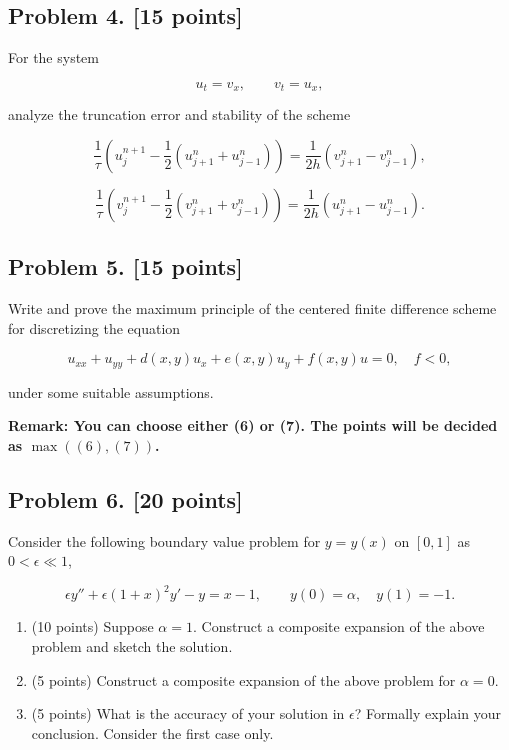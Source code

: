 \documentclass[11pt,a4paper]{article}
\begin{document}
\subsection{Problem 4. [15 points]}
For the system

\[
u_{t} = v_{x}, \qquad v_{t} = u_{x},
\]

analyze the truncation error and stability of the scheme

\[
\frac{1}{\tau} \left( u_{j}^{n+1} - \frac12 (u_{j+1}^{n} + u_{j-1}^{n}) \right) = \frac{1}{2h} (v_{j+1}^{n} - v_{j-1}^{n}),
\]

\[
\frac{1}{\tau} \left( v_{j}^{n+1} - \frac12 (v_{j+1}^{n} + v_{j-1}^{n}) \right) = \frac{1}{2h} (u_{j+1}^{n} - u_{j-1}^{n}).
\]

\subsection{Problem 5. [15 points]}
Write and prove the maximum principle of the centered finite difference scheme for discretizing the equation

\[
u_{xx} + u_{yy} + d(x,y) u_{x} + e(x,y) u_{y} + f(x,y) u = 0, \quad f < 0,
\]

under some suitable assumptions.

\noindent\textbf{Remark: You can choose either (6) or (7). The points will be decided as \(\max((6), (7))\).}

\subsection{Problem 6. [20 points]}
Consider the following boundary value problem for \(y = y(x)\) on \([0, 1]\) as \(0 < \epsilon \ll 1\),

\[
\epsilon y'' + \epsilon(1+x)^{2} y' - y = x - 1, \qquad y(0) = \alpha, \quad y(1) = -1.
\]

\begin{enumerate}[label=(\roman*)]
    \item (10 points) Suppose \(\alpha = 1\). Construct a composite expansion of the above problem and sketch the solution.
    \item (5 points) Construct a composite expansion of the above problem for \(\alpha = 0\).
    \item (5 points) What is the accuracy of your solution in \(\epsilon\)? Formally explain your conclusion. Consider the first case only.
\end{enumerate}
\end{document}
